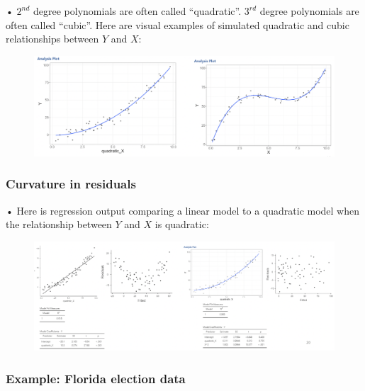 \documentclass[
  letterpaper,
  DIV=11,
  numbers=noendperiod]{scrreprt}
\begin{document}
• \(2^{nd}\) degree polynomials are often called ``quadratic''.
\(3^{rd}\) degree polynomials are often called ``cubic''. Here are
visual examples of simulated quadratic and cubic relationships between
\(Y\) and \(X\):

\begin{figure}

{\centering \includegraphics{images/mod4_pt2_4.png}

}

\end{figure}

\hypertarget{curvature-in-residuals}{%
\subsubsection{Curvature in residuals}\label{curvature-in-residuals}}

• Here is regression output comparing a linear model to a quadratic
model when the relationship between \(Y\) and \(X\) is quadratic:

\begin{figure}

{\centering \includegraphics{images/mod4_pt2_5.png}

}

\end{figure}

\hypertarget{example-florida-election-data}{%
\subsubsection{Example: Florida election
data}\label{example-florida-election-data}}
\end{document}
